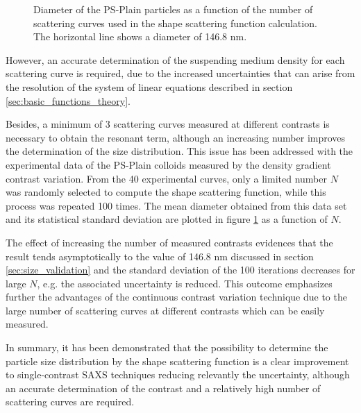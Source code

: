 \begin{figure}
	\begin{center}
		
	\end{center}
\caption[Diameter of the PS-Plain particles obtained from the shape scattering function as a function of the number of scattering curves.]{Diameter of the PS-Plain particles as a function of the number of scattering curves used in the shape scattering function calculation. The horizontal line shows a diameter of 146.8 nm.}
\label{fig:ResonantTermSimulationNumber}
\end{figure}

However, an accurate determination of the suspending medium density for each scattering curve is required, due to the increased uncertainties \citep{lefebvre_propagation_2000} that can arise from the resolution of the system of linear equations described in section \ref{sec:basic_functions_theory}.

Besides, a minimum of 3 scattering curves measured at different contrasts is necessary to obtain the resonant term, although an increasing number improves the determination of the size distribution. This issue has been addressed with the experimental data of the PS-Plain colloids measured by the density gradient contrast variation. From the 40 experimental curves, only a limited number $N$ was randomly selected to compute the shape scattering function, while this process was repeated 100 times. The mean diameter obtained from this data set and its statistical standard deviation are plotted in figure \ref{fig:ResonantTermSimulationNumber} as a function of $N$.

The effect of increasing the number of measured contrasts evidences that the result tends asymptotically to the value of 146.8 nm discussed in section \ref{sec:size_validation} and the standard deviation of the 100 iterations decreases for large $N$, e.g. the associated uncertainty is reduced. This outcome emphasizes further the advantages of the continuous contrast variation technique due to the large number of scattering curves at different contrasts which can be easily measured.

In summary, it has been demonstrated that the possibility to determine the particle size distribution by the shape scattering function is a clear improvement to single-contrast SAXS techniques reducing relevantly the uncertainty, although an accurate determination of the contrast and a relatively high number of scattering curves are required. 

